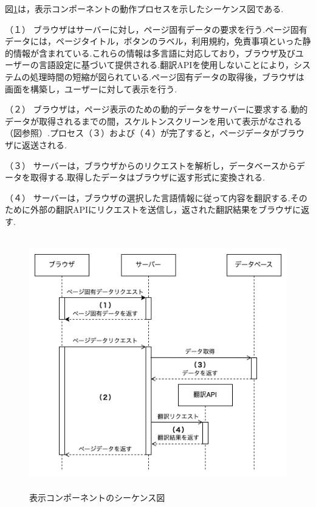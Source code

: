 \documentclass[b5paper,12pt,dvipdfmx]{jsreport}
\begin{document}
図\ref{display_component_sequence_diagram}は，表示コンポーネントの動作プロセスを示したシーケンス図である.

（１）
ブラウザはサーバーに対し，ページ固有データの要求を行う.ページ固有データには，ページタイトル，ボタンのラベル，利用規約，免責事項といった静的情報が含まれている.これらの情報は多言語に対応しており，ブラウザ及びユーザーの言語設定に基づいて提供される.翻訳APIを使用しないことにより，システムの処理時間の短縮が図られている.ページ固有データの取得後，ブラウザは画面を構築し，ユーザーに対して表示を行う.

（２）
ブラウザは，ページ表示のための動的データをサーバーに要求する.動的データが取得されるまでの間，スケルトンスクリーンを用いて表示がなされる（図参照）.プロセス（３）および（４）が完了すると，ページデータがブラウザに返送される.

（３）
サーバーは，ブラウザからのリクエストを解析し，データベースからデータを取得する.取得したデータはブラウザに返す形式に変換される.

（４）
サーバーは，ブラウザの選択した言語情報に従って内容を翻訳する.そのために外部の翻訳APIにリクエストを送信し，返された翻訳結果をブラウザに返す.



\newpage

\begin{figure}[H]
    \centering
    \includegraphics[width=120mm,height=110mm]{./img/components/display_component_sequence_diagram.png}
    \caption{表示コンポーネントのシーケンス図}
    \label{display_component_sequence_diagram}
\end{figure}
\end{document}
